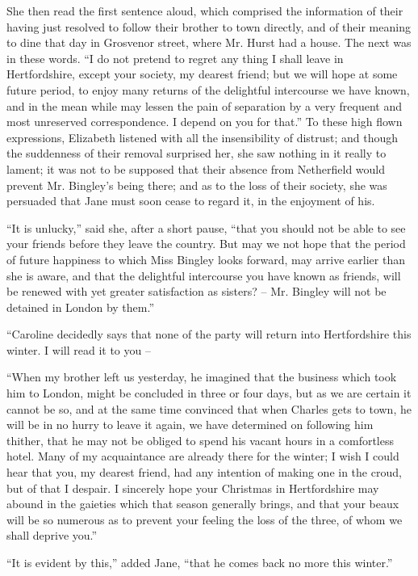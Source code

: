 She then read the first sentence aloud, which comprised
the information of their having just resolved to follow
their brother to town directly, and of their meaning to
dine that day in Grosvenor street, where Mr. Hurst had
a house. The next was in these words. “I do not pretend
to regret any thing I shall leave in Hertfordshire, except
your society, my dearest friend; but we will hope at
some future period, to enjoy many returns of the delightful
intercourse we have known, and in the mean while may
lessen the pain of separation by a very frequent and most
unreserved correspondence. I depend on you for that.”
To these high flown expressions, Elizabeth listened with all
the insensibility of distrust; and though the suddenness
of their removal surprised her, she saw nothing in it really
to lament; it was not to be supposed that their absence
from Netherfield would prevent Mr. Bingley’s being there;
and as to the loss of their society, she was persuaded that
Jane must soon cease to regard it, in the enjoyment of his.

“It is unlucky,” said she, after a short pause, “that
you should not be able to see your friends before they
leave the country. But may we not hope that the period
of future happiness to which Miss Bingley looks forward,
may arrive earlier than she is aware, and that the delightful
intercourse you have known as friends, will be renewed
with yet greater satisfaction as sisters? -- Mr. Bingley will
not be detained in London by them.”

“Caroline decidedly says that none of the party will
return into Hertfordshire this winter. I will read it to
you --

“When my brother left us yesterday, he imagined
that the business which took him to London, might be
concluded in three or four days, but as we are certain
it cannot be so, and at the same time convinced that
when Charles gets to town, he will be in no hurry to leave
it again, we have determined on following him thither,
that he may not be obliged to spend his vacant hours in
a comfortless hotel. Many of my acquaintance are already
there for the winter; I wish I could hear that you, my
dearest friend, had any intention of making one in the
croud, but of that I despair. I sincerely hope your Christmas
in Hertfordshire may abound in the gaieties which
that season generally brings, and that your beaux will be
so numerous as to prevent your feeling the loss of the three,
of whom we shall deprive you.”

“It is evident by this,” added Jane, “that he comes
back no more this winter.”

